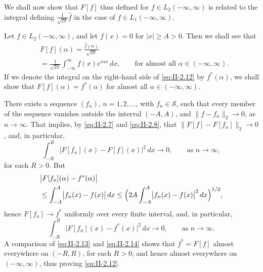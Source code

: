 We shall now show that $F[f]$ thus defined for $f\in L_{2}(-\infty,\infty)$ is related to the integral defining $\frac{1}{\sqrt{2\pi}}\hat f$ in the case of $f\in L_{1}(-\infty,\infty)$.

Let $f\in L_{2}(-\infty,\infty)$, and let $f(x)=0$ for $|x|\ge A>0$. Then we shall see that
\begin{equation}\tag{2.12}\label{eq:II-2.12}
\begin{aligned}
&F[f](\alpha) = \frac{\hat f(\alpha)}{\sqrt{2\pi}}\\
&= \frac{1}{\sqrt{2\pi}}  \int_{-\infty}^{\infty}f(x)e^{i\alpha x}\,dx,  \qquad\text{for almost all }\alpha\in(-\infty,\infty).
\end{aligned}
\end{equation}
If we denote the integral on the right-hand side of \eqref{eq:II-2.12} by $f^{*}(\alpha)$, we shall show that $F[f](\alpha)=f^{*}(\alpha)$ for almost all $\alpha\in(-\infty,\infty)$.

There exists a sequence $(f_{n})$, $n=1,2,\dots$, with $f_{n}\in\mathcal S$, such that every member of the sequence vanishes outside the interval $(-A,A)$, and $\|f-f_{n}\|_{2}\to 0$, as $n\to\infty$. That implies, by \eqref{eq:II-2.7} and \eqref{eq:II-2.8}, that $\|F[f]-F[f_{n}]\|_{2}\to 0$, and, in particular,
\begin{equation}\tag{2.13}\label{eq:II-2.13}
\int_{-R}^{R}\bigl|F[f_{n}](x)-F[f](x)\bigr|^{2}\,dx\to 0,\qquad\text{as }n\to\infty,
\end{equation}
for each $R>0$. But
\[
\begin{aligned}
&\bigl|F[f_{n}](\alpha) - f^{*}(\alpha)\bigr|\\
&\le \int_{-A}^{A}  \bigl|f_{n}(x) - f(x)\bigr|\,dx \le \Bigl(2A\int_{-A}^{A}\bigl|f_{n}(x)-f(x)\bigr|^{2}\,dx\Bigr)^{1/2},
\end{aligned}
\]
hence $F[f_{n}]\to f^{*}$ uniformly over every finite interval, and, in particular,
\begin{equation}\tag{2.14}\label{eq:II-2.14}
\int_{-R}^{R}\bigl|F[f_{n}](x)-f^{*}(x)\bigr|^{2}\,dx\to 0,\qquad\text{as }n\to\infty.
\end{equation}
A comparison of \eqref{eq:II-2.13} and \eqref{eq:II-2.14} shows that $f^{*}=F[f]$ almost everywhere on $(-R,R)$, for each $R>0$, and hence almost everywhere on $(-\infty,\infty)$, thus proving \eqref{eq:II-2.12}.

